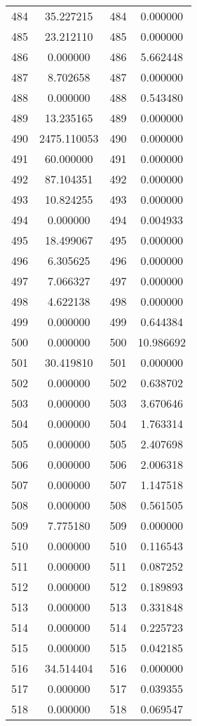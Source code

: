 \documentclass[12pt]{article}
\begin{document}
\begin{longtable}{@{}cccc@{}}
484 & 35.227215 & 484 & 0.000000 \\
485 & 23.212110 & 485 & 0.000000 \\
486 & 0.000000 & 486 & 5.662448 \\
487 & 8.702658 & 487 & 0.000000 \\
488 & 0.000000 & 488 & 0.543480 \\
489 & 13.235165 & 489 & 0.000000 \\
490 & 2475.110053 & 490 & 0.000000 \\
491 & 60.000000 & 491 & 0.000000 \\
492 & 87.104351 & 492 & 0.000000 \\
493 & 10.824255 & 493 & 0.000000 \\
494 & 0.000000 & 494 & 0.004933 \\
495 & 18.499067 & 495 & 0.000000 \\
496 & 6.305625 & 496 & 0.000000 \\
497 & 7.066327 & 497 & 0.000000 \\
498 & 4.622138 & 498 & 0.000000 \\
499 & 0.000000 & 499 & 0.644384 \\
500 & 0.000000 & 500 & 10.986692 \\
501 & 30.419810 & 501 & 0.000000 \\
502 & 0.000000 & 502 & 0.638702 \\
503 & 0.000000 & 503 & 3.670646 \\
504 & 0.000000 & 504 & 1.763314 \\
505 & 0.000000 & 505 & 2.407698 \\
506 & 0.000000 & 506 & 2.006318 \\
507 & 0.000000 & 507 & 1.147518 \\
508 & 0.000000 & 508 & 0.561505 \\
509 & 7.775180 & 509 & 0.000000 \\
510 & 0.000000 & 510 & 0.116543 \\
511 & 0.000000 & 511 & 0.087252 \\
512 & 0.000000 & 512 & 0.189893 \\
513 & 0.000000 & 513 & 0.331848 \\
514 & 0.000000 & 514 & 0.225723 \\
515 & 0.000000 & 515 & 0.042185 \\
516 & 34.514404 & 516 & 0.000000 \\
517 & 0.000000 & 517 & 0.039355 \\
518 & 0.000000 & 518 & 0.069547 \\

\end{longtable}
\end{document}
